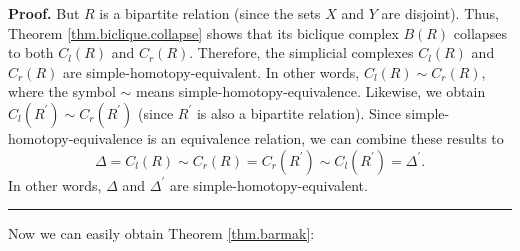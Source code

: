 \documentclass[numbers=enddot,12pt,final,onecolumn,notitlepage]{scrartcl}%
\theoremstyle{definition}
\newenvironment{proof}[1][Proof]{\noindent\textbf{#1.} }{\ \rule{0.5em}{0.5em}}
\begin{document}
\begin{proof}
But $R$ is a bipartite relation (since the sets $X$ and $Y$ are disjoint).
Thus, Theorem \ref{thm.biclique.collapse} shows that its biclique complex
$B\left(  R\right)  $ collapses to both $C_{l}\left(  R\right)  $ and
$C_{r}\left(  R\right)  $. Therefore, the simplicial complexes $C_{l}\left(
R\right)  $ and $C_{r}\left(  R\right)  $ are simple-homotopy-equivalent. In
other words, $C_{l}\left(  R\right)  \sim C_{r}\left(  R\right)  $, where the
symbol $\sim$ means simple-homotopy-equivalence. Likewise, we obtain
$C_{l}\left(  R^{\prime}\right)  \sim C_{r}\left(  R^{\prime}\right)  $ (since
$R^{\prime}$ is also a bipartite relation). Since simple-homotopy-equivalence
is an equivalence relation, we can combine these results to%
\[
\Delta=C_{l}\left(  R\right)  \sim C_{r}\left(  R\right)  =C_{r}\left(
R^{\prime}\right)  \sim C_{l}\left(  R^{\prime}\right)  =\Delta^{\prime}.
\]
In other words, $\Delta$ and $\Delta^{\prime}$ are simple-homotopy-equivalent.
\end{proof}

Now we can easily obtain Theorem \ref{thm.barmak}:
\end{document}
